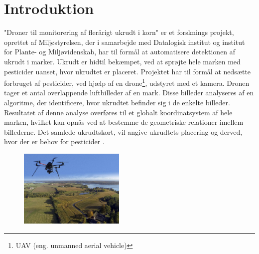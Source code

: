 \chapter{Introduktion} \label{sec:intro}
"Droner til monitorering af flerårigt ukrudt i korn"$ $ er et forsknings projekt, oprettet af Miljøstyrelsen, der i samarbejde med Datalogisk institut og institut for Plante- og Miljøvidenskab, har til formål at automatisere detektionen af ukrudt i marker.
Ukrudt er hidtil bekæmpet, ved at sprøjte hele marken med pesticider uanset, hvor ukrudtet er placeret. Projektet har til formål at nedsætte forbruget af pesticider, ved hjælp af en drone\footnote{UAV (eng. unmanned aerial vehicle)}, udstyret med et kamera. Dronen tager et antal overlappende luftbilleder af en mark. Disse billeder analyseres af en algoritme, der identificere, hvor ukrudtet befinder sig i de enkelte billeder. Resultatet af denne analyse overføres til et globalt koordinatsystem af hele marken, hvilket kan opnås ved at bestemme de geometriske relationer imellem billederne. Det samlede ukrudtskort, vil angive ukrudtets placering og derved, hvor der er behov for pesticider \cite{drone}.
\begin{figure}[H]
    \centering
    \includegraphics[width=0.45\textwidth]{fig/drone4.jpg}
     \vspace{-0.5em}
    \begin{center}    
    \label{fig:difference}
     \end{center}
     \vspace{-3em}
  \end{figure} \noindent
